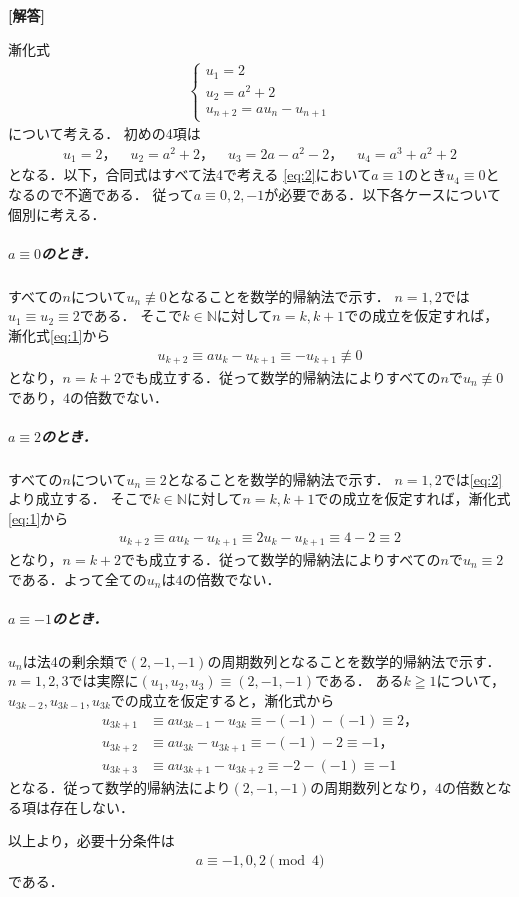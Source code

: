 \documentclass[../../main.tex]{subfiles}
\begin{document}
\begin{oframed}
  
\end{oframed}

{\bf [解答]}

漸化式
\begin{align}
  \begin{cases}
    u_1 = 2 \\
    u_2 = a^2+2 \\
    u_{n+2} = au_{n}-u_{n+1}
  \end{cases} \label{eq:1}
\end{align}
について考える．
初めの4項は
\begin{align}
  u_1=2，\quad u_2=a^2+2，\quad u_3=2a-a^2-2，\quad
  u_4=a^3+a^2+2 \label{eq:2}
\end{align}
となる．以下，合同式はすべて法4で考える
\cref{eq:2}において$a\equiv1$のとき$u_4\equiv0$となるので不適である．
従って$a\equiv0,2,-1$が必要である．以下各ケースについて個別に考える．

\subparagraph{$a\equiv0$のとき．}

すべての$n$について$u_n\not\equiv0$となることを数学的帰納法で示す．
$n=1,2$では$u_1\equiv u_2\equiv2$である．
そこで$k\in\mathbb{N}$に対して$n=k,k+1$での成立を仮定すれば，漸化式\cref{eq:1}から
\begin{align}
  u_{k+2}\equiv au_k - u_{k+1} \equiv -u_{k+1}\not\equiv0
\end{align}
となり，$n=k+2$でも成立する．従って数学的帰納法によりすべての$n$で$u_n\not\equiv0$であり，$4$の倍数でない．

\subparagraph{$a\equiv2$のとき．}
すべての$n$について$u_n\equiv2$となることを数学的帰納法で示す．
$n=1,2$では\cref{eq:2}より成立する．
そこで$k\in\mathbb{N}$に対して$n=k,k+1$での成立を仮定すれば，漸化式\cref{eq:1}から
\begin{align}
  u_{k+2} \equiv au_k - u_{k+1} \equiv 2u_k-u_{k+1}\equiv 4-2 \equiv 2
\end{align}
となり，$n=k+2$でも成立する．従って数学的帰納法によりすべての$n$で$u_n\equiv2$である．よって全ての$u_n$は$4$の倍数でない．

\subparagraph{$a\equiv-1$のとき．}
$u_n$は法4の剰余類で$(2,-1,-1)$の周期数列となることを数学的帰納法で示す．
$n=1,2,3$では実際に$(u_1,u_2,u_3)\equiv(2,-1,-1)$である．
ある$k\geqq1$について，$u_{3k-2},u_{3k-1},u_{3k}$での成立を仮定すると，漸化式から
\begin{align}
  u_{3k+1}&\equiv au_{3k-1} - u_{3k}   \equiv-(-1)-(-1)\equiv2，\\
  u_{3k+2}&\equiv au_{3k}   - u_{3k+1} \equiv -(-1)-2\equiv-1，\\
  u_{3k+3}&\equiv au_{3k+1} - u_{3k+2} \equiv -2-(-1)\equiv-1
\end{align}
となる．従って数学的帰納法により$(2,-1,-1)$の周期数列となり，$4$の倍数となる項は存在しない．
\casesend

以上より，必要十分条件は
\begin{align}
  a\equiv-1,0,2\pmod{4}
\end{align}
である．

\newpage
\end{document}
